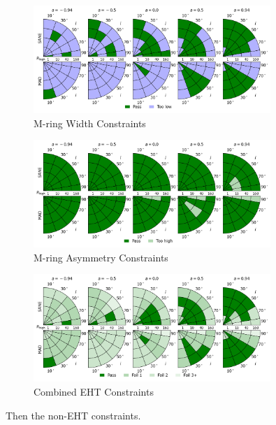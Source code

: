 \begin{figure}
  \centering
  \includegraphics[width=0.8\textwidth]{./figures/Mring_w_Constraints.png}
  \caption{M-ring Width Constraints}
  \label{fig:mring_width_pizza}
\end{figure}
\begin{figure}
  \centering
  \includegraphics[width=0.8\textwidth]{./figures/Mring_f1_Constraints.png}
  \caption{M-ring Asymmetry Constraints}
  \label{fig:mring_asymm_pizza}
\end{figure}
\begin{figure}
  \centering
  \includegraphics[width=0.8\textwidth]{./figures/Interferometric_Constraints.png}
  \caption{Combined EHT Constraints}
  \label{fig:eht_comb_pizza}
\end{figure}

Then the non-EHT constraints.

